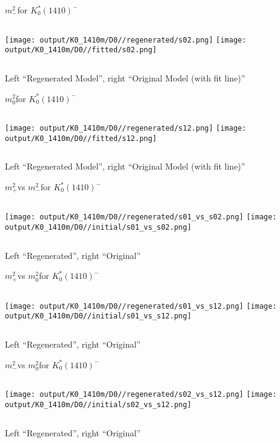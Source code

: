\documentclass{beamer}
\newcommand{\MP}{\ensuremath{m^2_+}}
\newcommand{\MM}{\ensuremath{m^2_-}}
\newcommand{\MZ}{\ensuremath{m^2_0}}
\begin{document}
\begin{frame}{\MM for $K_0^*(1410)^-$}
\begin{columns}[t]
\centering
\texttt{[image: output/K0\_1410m/D0//regenerated/s02.png]}
\centering
\texttt{[image: output/K0\_1410m/D0//fitted/s02.png]}
\end{columns}
    \centering
    Left ``Regenerated Model'', right ``Original Model (with fit line)''
\end{frame}                   

\begin{frame}{\MZ for $K_0^*(1410)^-$}
\begin{columns}[t]
\centering
\texttt{[image: output/K0\_1410m/D0//regenerated/s12.png]}
\centering
\texttt{[image: output/K0\_1410m/D0//fitted/s12.png]}
\end{columns}
    \centering
    Left ``Regenerated Model'', right ``Original Model (with fit line)''
\end{frame}                   


\begin{frame}{\MP vs \MM for $K_0^*(1410)^-$}
\begin{columns}[t]
\centering
\texttt{[image: output/K0\_1410m/D0//regenerated/s01\_vs\_s02.png]}
\centering
\texttt{[image: output/K0\_1410m/D0//initial/s01\_vs\_s02.png]}
\end{columns}
    \centering
    Left ``Regenerated'', right ``Original''
\end{frame} 


\begin{frame}{\MP vs \MZ for $K_0^*(1410)^-$}
\begin{columns}[t]
\centering
\texttt{[image: output/K0\_1410m/D0//regenerated/s01\_vs\_s12.png]}
\centering
\texttt{[image: output/K0\_1410m/D0//initial/s01\_vs\_s12.png]}
\end{columns}
    \centering
    Left ``Regenerated'', right ``Original''
\end{frame} 


\begin{frame}{\MM vs \MZ for $K_0^*(1410)^-$}
\begin{columns}[t]
\centering
\texttt{[image: output/K0\_1410m/D0//regenerated/s02\_vs\_s12.png]}
\centering
\texttt{[image: output/K0\_1410m/D0//initial/s02\_vs\_s12.png]}
\end{columns}
    \centering
    Left ``Regenerated'', right ``Original''
\end{frame} 
\end{document}
